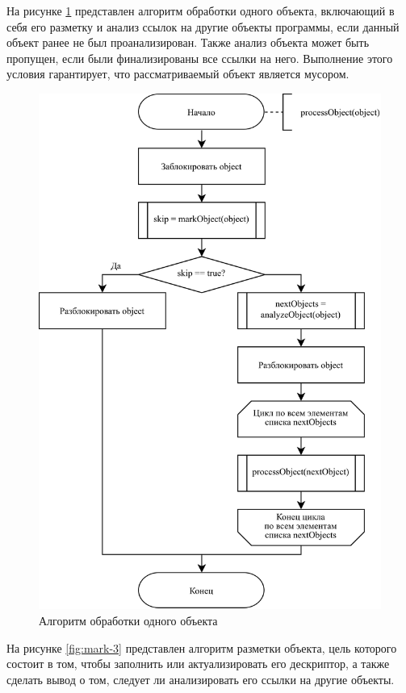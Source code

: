 На рисунке \ref{fig:mark-2} представлен алгоритм обработки одного объекта, включающий в себя его разметку и анализ ссылок на другие объекты программы, если данный объект ранее не был проанализирован. Также анализ объекта может быть пропущен, если были финализированы все ссылки на него. Выполнение этого условия гарантирует, что рассматриваемый объект является мусором.

\begin{figure}[H]
	\centering
	\includegraphics[scale=0.185]{assets/mark-2.png}
	\caption{Алгоритм обработки одного объекта}
	\label{fig:mark-2}
\end{figure}

На рисунке \ref{fig:mark-3} представлен алгоритм разметки объекта, цель которого состоит в том, чтобы заполнить или актуализировать его дескриптор, а также сделать вывод о том, следует ли анализировать его ссылки на другие объекты.

